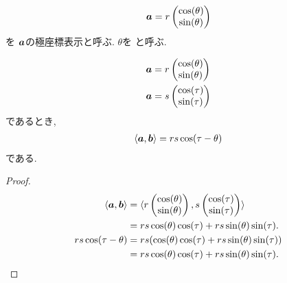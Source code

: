 \begin{definition}
\begin{align*}
  \boldsymbol{a} = r \begin{pmatrix}\cos(\theta)\\\sin(\theta)\end{pmatrix}
\end{align*}
を $\boldsymbol{a}$の極座標表示と呼ぶ.
$\theta$を
%
%
%
%
と呼ぶ.
\end{definition}
\begin{prop}
  \label{thm:innerprod:polar}
\begin{align*}
  \boldsymbol{a} &= r \begin{pmatrix}\cos(\theta)\\\sin(\theta)\end{pmatrix}\\
  \boldsymbol{a} &= s \begin{pmatrix}\cos(\tau)\\\sin(\tau)\end{pmatrix}
\end{align*}
であるとき,
\begin{align*}
  \Braket{\boldsymbol{a},\boldsymbol{b}}=rs\cos(\tau-\theta)
\end{align*}
である.
\end{prop}
\begin{proof}
\begin{align*}
  \Braket{\boldsymbol{a},\boldsymbol{b}}
  &=
  \braket{r \begin{pmatrix}\cos(\theta)\\\sin(\theta)\end{pmatrix},
  s \begin{pmatrix}\cos(\tau)\\\sin(\tau)\end{pmatrix}}\\
  &=
  rs \cos(\theta)\cos(\tau)+rs \sin(\theta)\sin(\tau).\\
  rs\cos(\tau-\theta)
  &=rs(\cos(\theta)\cos(\tau)+rs \sin(\theta)\sin(\tau))\\
  &=rs \cos(\theta)\cos(\tau)+rs \sin(\theta)\sin(\tau).
\end{align*}
\end{proof}

